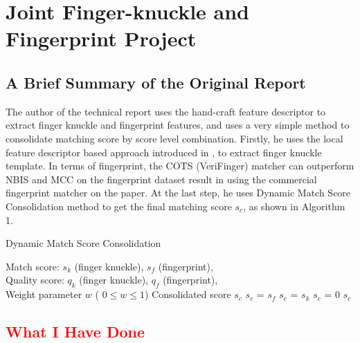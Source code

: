 
\section{Joint Finger-knuckle and Fingerprint Project}

\subsection{A Brief Summary of the Original Report}

The author of the technical report uses the hand-craft feature descriptor to extract finger knuckle and fingerprint features, and uses a very simple method to consolidate matching score by score level combination. Firstly, he uses the local feature descriptor based approach introduced in \cite{zheng20163d}, \cite{kumar2016personal} to extract finger knuckle template. In terms of fingerprint, the COTS (VeriFinger) \cite{verifinger} matcher can outperform NBIS \cite{watson2007user} and MCC \cite{cappelli2010minutia} on the fingerprint dataset result in using the commercial fingerprint matcher on the paper. At the last step, he uses Dynamic Match Score Consolidation method to get the final matching score $s_c$, as shown in Algorithm 1.

\begin{algorithm}[h!]
    \centering
    \renewcommand{\algorithmicrequire}{\textbf{Input:}}
    \renewcommand{\algorithmicensure}{\textbf{Output:}}
    \caption{Dynamic Match Score Consolidation}
    \begin{algorithmic}[1]
        \REQUIRE Match score: $s_k$ (finger knuckle), $s_f$ (fingerprint), \\
        Quality score: $q_k$ (finger knuckle), $q_f$ (fingerprint), \\
        Weight parameter $w$ ( $0 \leq w \leq 1$)
        \ENSURE Consolidated score $s_c$
        \STATE $s_c$ = $s_f$
        \ENDIF
        \STATE $s_c$ = $s_k$
        \ENDIF
        \STATE $s_c$ = 0
        \ELSE
        \ENDIF
        \RETURN $s_c$
    \end{algorithmic}
\end{algorithm}

\textcolor{red}{\subsection{What I Have Done}}
